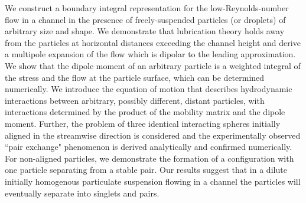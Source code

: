 \begin{paper}

\makepapertitle

%
\begin{paperabstract}
	We construct a boundary integral representation for the low-Reynolds-number flow in a channel in the presence of freely-suspended particles (or droplets) of arbitrary size and shape. We demonstrate that lubrication theory holds away from the particles at horizontal distances exceeding the channel height and derive a multipole expansion of the flow which is dipolar to the leading approximation. We show that the dipole moment of an arbitrary particle is a weighted integral of the stress and the flow at the particle surface, which can be determined numerically. We introduce the equation of motion that describes hydrodynamic interactions between arbitrary, possibly different, distant particles, with interactions determined by the product of the mobility matrix and the dipole moment. Further, the problem of three identical interacting spheres initially aligned in the streamwise direction is considered and the experimentally observed ``pair exchange" phenomenon is derived analytically and confirmed numerically. For non-aligned particles, we demonstrate the formation of a configuration with one particle separating from a stable pair. Our results suggest that in a dilute initially homogenous particulate suspension flowing in a channel the particles will eventually separate into singlets and pairs.
\end{paperabstract}


%



%


%


\end{paper}
